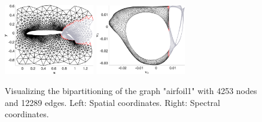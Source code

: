 \documentclass[unicode,11pt,a4paper,oneside,numbers=endperiod,openany]{scrartcl}
\begin{document}
\begin{figure}[!h]
\begin{center}
  \includegraphics[width=0.35\textwidth]{images/airfoil_part_spat.png}
  \includegraphics[width=0.35\textwidth]{images/airfoil_part_spec.png}
  \caption{Visualizing the bipartitioning of the graph "airfoil1" with 4253 nodes and 12289 edges. Left: Spatial coordinates. Right: Spectral coordinates.}
  \label{fig:spectral_layout}
\end{center}
\end{figure}
\end{document}
